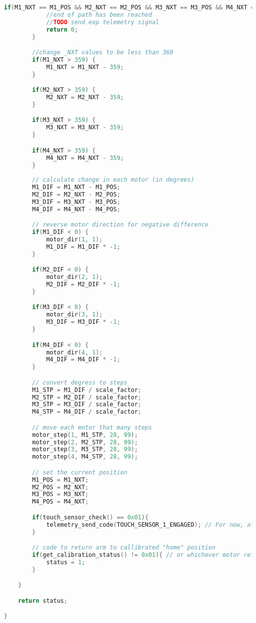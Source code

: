 \begin{lstlisting}[language=C]
		if(M1_NXT == M1_POS && M2_NXT == M2_POS && M3_NXT == M3_POS && M4_NXT == M4_POS) {
			//end of path has been reached
			//TODO send eop telemetry signal
			return 0;
		}

		//change _NXT values to be less than 360
		if(M1_NXT > 359) {
			M1_NXT = M1_NXT - 359;
		}

		if(M2_NXT > 359) {
			M2_NXT = M2_NXT - 359;
		}

		if(M3_NXT > 359) {
			M3_NXT = M3_NXT - 359;
		}

		if(M4_NXT > 359) {
			M4_NXT = M4_NXT - 359;
		}
		
		// calculate change in each motor (in degrees)
		M1_DIF = M1_NXT - M1_POS;
		M2_DIF = M2_NXT - M2_POS;
		M3_DIF = M3_NXT - M3_POS;
		M4_DIF = M4_NXT - M4_POS;

		// reverse motor direction for negative difference
		if(M1_DIF < 0) {
			motor_dir(1, 1);
			M1_DIF = M1_DIF * -1;
		}

		if(M2_DIF < 0) {
			motor_dir(2, 1);
			M2_DIF = M2_DIF * -1;
		}

		if(M3_DIF < 0) {
			motor_dir(3, 1);
			M3_DIF = M3_DIF * -1;
		}

		if(M4_DIF < 0) {
			motor_dir(4, 1);
			M4_DIF = M4_DIF * -1;
		}

		// convert degress to steps
		M1_STP = M1_DIF / scale_factor;
		M2_STP = M2_DIF / scale_factor;
		M3_STP = M3_DIF / scale_factor;
		M4_STP = M4_DIF / scale_factor;

		// move each motor that many steps
		motor_step(1, M1_STP, 28, 99);
		motor_step(2, M2_STP, 28, 99);
		motor_step(3, M3_STP, 28, 99);
		motor_step(4, M4_STP, 28, 99);

		// set the current position
		M1_POS = M1_NXT;
		M2_POS = M2_NXT;
		M3_POS = M3_NXT;
		M4_POS = M4_NXT;

		if(touch_sensor_check() == 0x01){
			telemetry_send_code(TOUCH_SENSOR_1_ENGAGED); // For now, always send TOUCH_SENSOR_1_ENGAGED.
		}

		// code to return arm to callibrated "home" position
		if(get_calibration_status() != 0x01){ // or whichever motor refers to the home position
			status = 1;
		}

	}

	return status;

}
\end{lstlisting}


